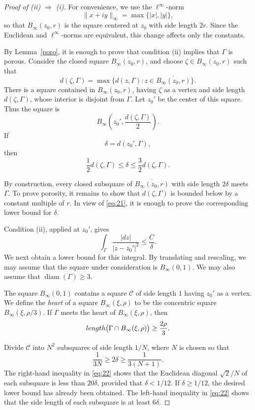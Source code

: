 \documentclass[11pt]{article}
\numberwithin{equation}{section}
\theoremstyle{remark}
\newcommand{\diam}{\operatorname{diam}}
\begin{document}
\begin{proof}[Proof of {\rm (ii) $\Rightarrow$ (i)}]
For convenience, we use the \(\ell^\infty\)-norm
\[
  \|x+iy\|_\infty=\max\{|x|,|y|\},
\]
so that \(B_\infty(z_0,r)\) is the square centered at \(z_0\) with side
length \(2r\). Since the Euclidean and \(\ell^\infty\)-norms are
equivalent, this change affects only the constants.

By Lemma~\ref{poro}, it is enough to prove that condition (ii)
implies that \(\Gamma\) is porous. Consider the closed square
\(\overline{B_\infty(z_0,r)}\), and choose
\(\zeta\in\overline{B_\infty(z_0,r)}\) such that
\[
 d(\zeta,\Gamma)
 =\max\bigl\{d(z,\Gamma):
 z\in\overline{B_\infty(z_0,r)}\bigr\}.
\]
There is a square contained in \(B_\infty(z_0,r)\), having \(\zeta\) as
a vertex and side length \(d(\zeta,\Gamma)\), whose interior is disjoint
from \(\Gamma\). Let \(z_0'\) be the center of this square. Thus the
square is
\[
 B_\infty\left(z_0',\frac{d(\zeta,\Gamma)}{2}\right).
\]
If
\[
 \delta=d(z_0',\Gamma),
\]
then
\begin{equation}\label{eq:21}
 \frac12d(\zeta,\Gamma)
 \le\delta
 \le\frac32d(\zeta,\Gamma).
\end{equation}

By construction, every closed subsquare of
\(\overline{B_\infty(z_0,r)}\) with side length \(2\delta\) meets
\(\Gamma\). To prove porosity, it remains to show that
\(d(\zeta,\Gamma)\) is bounded below by a constant multiple of \(r\).
In view of \eqref{eq:21}, it is enough to prove the corresponding lower
bound for \(\delta\).

Condition (ii), applied at \(z_0'\), gives
\[
  \int_\Gamma\frac{|dz|}{|z-z_0'|^2}
  \le\frac{C}{\delta}.
\]
We next obtain a lower bound for this integral. By translating and
rescaling, we may assume that the square under consideration is
\(B_\infty(0,1)\). We may also assume that
\(\diam(\Gamma)\ge3\).

The square \(B_\infty(0,1)\) contains a square \(\mathcal C\) of side
length \(1\) having \(z_0'\) as a vertex. We define the \emph{heart} of
a square \(B_\infty(\xi,\rho)\) to be the concentric square
\(B_\infty(\xi,\rho/3)\). If \(\Gamma\) meets the heart of
\(B_\infty(\xi,\rho)\), then
\[
 {\rm length}\bigl(\Gamma\cap B_\infty(\xi,\rho)\bigr)
 \ge \frac{2\rho}{3}.
\]

Divide \(\mathcal C\) into \(N^2\) subsquares of side length \(1/N\),
where \(N\) is chosen so that
\begin{equation}\label{eq:22}
 \frac{1}{3N}\ge2\delta\ge\frac{1}{3(N+1)}.
\end{equation}
The right-hand inequality in \eqref{eq:22} shows that the Euclidean
diagonal \(\sqrt2/N\) of each subsquare is less than \(20\delta\),
provided that \(\delta<1/12\). If \(\delta\ge1/12\), the desired lower
bound has already been obtained. The left-hand inequality in
\eqref{eq:22} shows that the side length of each subsquare is at least
\(6\delta\).


\end{proof}
\end{document}
